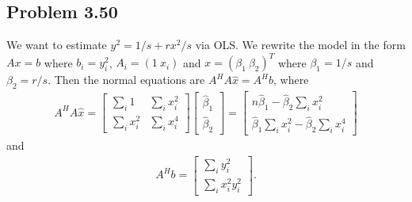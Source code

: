 \documentclass[letterpaper,12pt]{article}
\theoremstyle{definition}
\begin{document}
\begin{spacing}{1.3}{}
\begin{enumerate}
\end{enumerate}
	

\subsection*{Problem 3.50}
	We want to estimate $y^2=1/s+rx^2/s$ via OLS.
	We rewrite the model in the form $Ax=b$ where
	$b_i=y_i^2$, $A_i=(1\ x_i)$ and $x=(\beta_1\ \beta_2)^T$ where $\beta_1=1/s$ and $\beta_2=r/s$.
	Then the normal equations are $A^HA\hat{x}=A^Hb$, where
	\begin{align*}
	A^HA\hat{x} =
	\begin{bmatrix}
	\sum_i 1 & \sum_ix_i^2\\
	\sum_ix_i^2& \sum_ix_i^4
	\end{bmatrix}
	\begin{bmatrix}
	\hat{\beta}_1\\ \hat{\beta}_2
	\end{bmatrix} =
	\begin{bmatrix}
	n\hat{\beta}_1 - \hat{\beta}_2\sum_i x_i^2\\
	\hat{\beta}_1\sum_ix_i^2 - \hat{\beta}_2\sum_ix_i^4
	\end{bmatrix}
	\end{align*}
	and
	\begin{align*}
	A^Hb=
	\begin{bmatrix}
	\sum_i y_i^2\\
	\sum_i x_i^2y_i^2
	\end{bmatrix}.
	\end{align*}
	

 \end{spacing}
\end{document}
